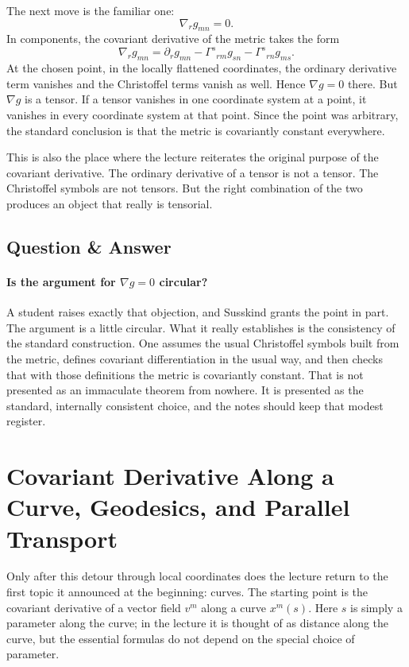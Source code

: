 The next move is the familiar one:
\begin{equation}
\nabla_{r}g_{mn}=0.
\end{equation}
In components, the covariant derivative of the metric takes the form
\begin{equation}
\nabla_{r}g_{mn}
=
\partial_{r}g_{mn}
-\Gamma^{s}{}_{rm}g_{sn}
-\Gamma^{s}{}_{rn}g_{ms}.
\end{equation}
At the chosen point, in the locally flattened coordinates, the ordinary derivative term vanishes and the Christoffel terms vanish as well. Hence \(\nabla g=0\) there. But \(\nabla g\) is a tensor. If a tensor vanishes in one coordinate system at a point, it vanishes in every coordinate system at that point. Since the point was arbitrary, the standard conclusion is that the metric is covariantly constant everywhere.

This is also the place where the lecture reiterates the original purpose of the covariant derivative. The ordinary derivative of a tensor is not a tensor. The Christoffel symbols are not tensors. But the right combination of the two produces an object that really is tensorial.

\subsection{Question \& Answer}

\paragraph{Is the argument for \(\nabla g=0\) circular?}

A student raises exactly that objection, and Susskind grants the point in part. The argument is a little circular. What it really establishes is the consistency of the standard construction. One assumes the usual Christoffel symbols built from the metric, defines covariant differentiation in the usual way, and then checks that with those definitions the metric is covariantly constant. That is not presented as an immaculate theorem from nowhere. It is presented as the standard, internally consistent choice, and the notes should keep that modest register.

\section{Covariant Derivative Along a Curve, Geodesics, and Parallel Transport}

Only after this detour through local coordinates does the lecture return to the first topic it announced at the beginning: curves. The starting point is the covariant derivative of a vector field \(v^{m}\) along a curve \(x^{m}(s)\). Here \(s\) is simply a parameter along the curve; in the lecture it is thought of as distance along the curve, but the essential formulas do not depend on the special choice of parameter.

